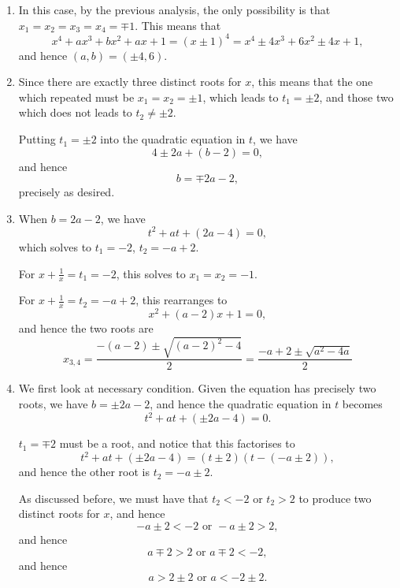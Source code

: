 \begin{enumerate}
    \item In this case, by the previous analysis, the only possibility is that \(x_1 = x_2 = x_3 = x_4 = \mp 1\). This means that
          \[
              x^4 + ax^3 + bx^2 + ax + 1 = (x \pm 1)^4 = x^4 \pm 4x^3 + 6x^2 \pm 4x + 1,
          \]
          and hence \((a, b) = (\pm 4, 6)\).

    \item Since there are exactly three distinct roots for \(x\), this means that the one which repeated must be \(x_1 = x_2 = \pm 1\), which leads to \(t_1 = \pm 2\), and those two which does not leads to \(t_2 \neq \pm 2\).

          Putting \(t_1 = \pm 2\) into the quadratic equation in \(t\), we have
          \[
              4 \pm 2a + (b - 2) = 0,
          \]
          and hence
          \[
              b = \mp 2a - 2,
          \]
          precisely as desired.

    \item When \(b = 2a - 2\), we have
          \[
              t^2 + at + (2a - 4) = 0,
          \]
          which solves to \(t_1 = -2\), \(t_2 = - a + 2\).

          For \(x + \frac{1}{x} = t_1 = -2\), this solves to \(x_1 = x_2 = -1\).

          For \(x + \frac{1}{x} = t_2 = -a + 2\), this rearranges to
          \[
              x^2 + (a - 2)x + 1 = 0,
          \]
          and hence the two roots are
          \[
              x_{3, 4} = \frac{-(a - 2) \pm \sqrt{(a - 2)^2 - 4}}{2} = \frac{-a + 2 \pm \sqrt{a^2 - 4a}}{2}
          \]

    \item We first look at necessary condition. Given the equation has precisely two roots, we have \(b = \pm 2a - 2\), and hence the quadratic equation in \(t\) becomes
          \[
              t^2 + at + (\pm 2a - 4) = 0.
          \]

          \(t_1 = \mp 2\) must be a root, and notice that this factorises to
          \[
              t^2 + at + (\pm 2a - 4) = (t \pm 2) (t - (-a \pm 2)),
          \]
          and hence the other root is \(t_2 = -a \pm 2\).

          As discussed before, we must have that \(t_2 < -2\) or \(t_2 > 2\) to produce two distinct roots for \(x\), and hence
          \[
              -a \pm 2 < -2 \text{ or } -a \pm 2 > 2,
          \]
          and hence
          \[
              a \mp 2 > 2 \text{ or } a \mp 2 < -2,
          \]
          and hence
          \[
              a > 2 \pm 2 \text{ or } a < -2 \pm 2.
          \]


\end{enumerate}
